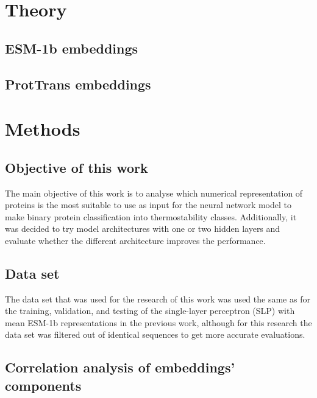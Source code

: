 \documentclass[12pt]{article}
\begin{document}
	\begin{otherlanguage}{lithuanian}
		
	\end{otherlanguage}
	
	\newpage

	\section{Theory}

	\subsection{ESM-1b embeddings}

	\subsection{ProtTrans embeddings}

	\newpage

	\section{Methods}

	\subsection{Objective of this work}

	The main objective of this work is to analyse 
	which numerical representation of proteins is the most 
	suitable to use as input for the neural network 
	model to make binary protein classification into thermostability
	classes. Additionally, it was decided to try model 
	architectures with one or two hidden layers and evaluate 
	whether the different architecture improves the 
	performance.

	\subsection{Data set}

	The data set that was used for the research of this work was 
	used the same as for the training, validation, and testing of 
	the single-layer perceptron (SLP) with mean ESM-1b 
	representations in the previous work, although for this 
	research the data set was filtered out of identical sequences to 
	get more accurate evaluations.
	
	\subsection{Correlation analysis of embeddings' components}
\end{document}
